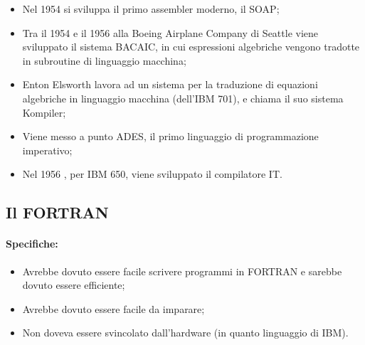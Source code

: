 \begin{itemize}
    \item Nel 1954 si sviluppa il primo assembler moderno, il SOAP;
    \item Tra il 1954 e il 1956 alla Boeing Airplane Company di Seattle
    viene sviluppato il sistema BACAIC, in cui espressioni algebriche
    vengono tradotte in subroutine di linguaggio macchina;
    \item Enton
    Elsworth lavora ad un sistema per la traduzione di equazioni
    algebriche in linguaggio macchina (dell’IBM 701), e chiama il suo
    sistema Kompiler;
    \item Viene messo a punto ADES, il primo linguaggio di programmazione imperativo;
    \item Nel 1956 , per IBM 650, viene sviluppato il compilatore IT.
\end{itemize}


\subsection{Il FORTRAN}


\paragraph{Specifiche:}

\begin{itemize}
    \item Avrebbe dovuto essere facile scrivere programmi in FORTRAN e sarebbe dovuto essere
    efficiente;
    \item Avrebbe dovuto essere facile da imparare;
    \item Non doveva essere svincolato dall'hardware (in quanto linguaggio di IBM).
\end{itemize}

